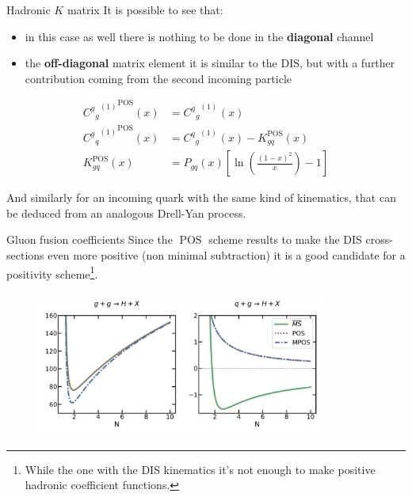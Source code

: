 \documentclass[9pt]{beamer}
\DeclareMathOperator{\msbar}{\overline{MS}}
\DeclareMathOperator{\pos}{POS}
\begin{document}
\begin{frame}{Hadronic $K$ matrix}
    It is possible to see that:
    \begin{itemize}
        \item in this case as well there is nothing to be done in the \textbf{diagonal} channel
        \item the \textbf{off-diagonal} matrix element it is similar to the
            DIS, but with a further contribution coming from the second
            incoming particle
    \end{itemize}
    \begin{align*}
        {{C^g{}_g}^{(1)}}^{\pos}(x)  &=  {{C^g{}_g}^{(1)}}^{\msbar}(x)\\
        {{C^g{}_q}^{(1)}}^{\pos} (x) &=  {{C^q{}_g}^{(1)}}^{\msbar} (x) - K_{gq}^{\pos} (x)\\
        K_{gq}^{\pos} (x) &=  P_{gq}(x)\left[\ln\left(\frac{(1-x)^2}{x}\right)
        - 1\right]
    \end{align*}

    And similarly for an incoming quark with the same kind of kinematics, that
    can be deduced from an analogous Drell-Yan process.
\end{frame}

\begin{frame}{Gluon fusion coefficients}
    Since the $\pos$ scheme results to make the DIS cross-sections even more
    positive (non minimal subtraction) it is a good candidate for a positivity
    scheme\footnote{While the one with the DIS kinematics it's not enough to
    make positive hadronic coefficient functions.}.
    \begin{figure}
      \includegraphics[width=0.85\textwidth]{pictures/higgs}
    \end{figure}
\end{frame}
\end{document}
